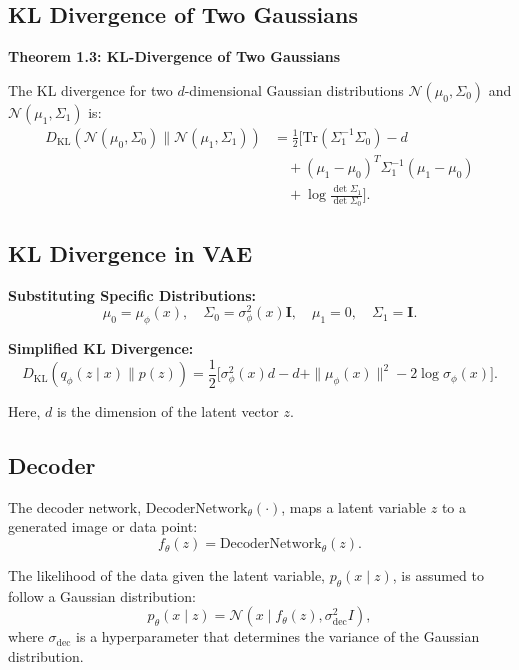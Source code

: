 \subsection{KL Divergence of Two Gaussians}
\begin{mdframed}
\textbf{Theorem 1.3: KL-Divergence of Two Gaussians} ~\cite{chan2025tutorial}

The KL divergence for two \(d\)-dimensional Gaussian distributions \( \mathcal{N}(\mu_0, \Sigma_0) \) and \( \mathcal{N}(\mu_1, \Sigma_1) \) is:
\begin{align*}
D_{\text{KL}}\left(\mathcal{N}(\mu_0, \Sigma_0) \parallel \mathcal{N}(\mu_1, \Sigma_1)\right) 
&= \frac{1}{2} \Big[ \text{Tr}(\Sigma_1^{-1} \Sigma_0) - d \\
&\quad + (\mu_1 - \mu_0)^T \Sigma_1^{-1} (\mu_1 - \mu_0) \\
&\quad + \log \frac{\det \Sigma_1}{\det \Sigma_0} \Big].
\end{align*}
\end{mdframed}

\subsection{KL Divergence in VAE}

\textbf{Substituting Specific Distributions:}
\[
\mu_0 = \mu_\phi(x), \quad \Sigma_0 = \sigma_\phi^2(x) \textbf{I}, \quad \mu_1 = 0, \quad \Sigma_1 = \textbf{I}.
\]

\textbf{Simplified KL Divergence:}
\[
D_{\text{KL}}\left(q_\phi(z \mid x) \parallel p(z)\right) = 
\frac{1}{2} \Big[ 
\sigma_\phi^2(x) d - d + \|\mu_\phi(x)\|^2 - 2 \log \sigma_\phi(x) 
\Big].
\]

Here, \(d\) is the dimension of the latent vector \(z\).

\subsection{Decoder}

The decoder network, \( \text{DecoderNetwork}_\theta(\cdot) \), maps a latent variable \( z \) to a generated image or data point:
\[
f_\theta(z) = \text{DecoderNetwork}_\theta(z).
\]

The likelihood of the data given the latent variable, \( p_\theta(x \mid z) \), is assumed to follow a Gaussian distribution:
\[
p_\theta(x \mid z) = \mathcal{N}(x \mid f_\theta(z), \sigma_{\text{dec}}^2 I),
\]
where \( \sigma_{\text{dec}} \) is a hyperparameter that determines the variance of the Gaussian distribution. 

